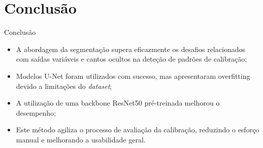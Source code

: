 \section{Conclusão}
\begin{frame}{Conclusão}


      \begin{itemize}
      \Large
        \item<1-> A abordagem da segmentação supera eficazmente os desafios relacionados com saídas variáveis e cantos ocultos na deteção de padrões de calibração;
        \item<2-> Modelos U-Net foram utilizados com sucesso, mas apresentaram overfitting devido a limitações do \textit{dataset};
        \item<3-> A utilização de uma backbone ResNet50 pré-treinada melhorou o desempenho;
        \item<4-> Este método agiliza o processo de avaliação da calibração, reduzindo o esforço manual e melhorando a usabilidade geral.
      \end{itemize}


\end{frame}

\maketitle
